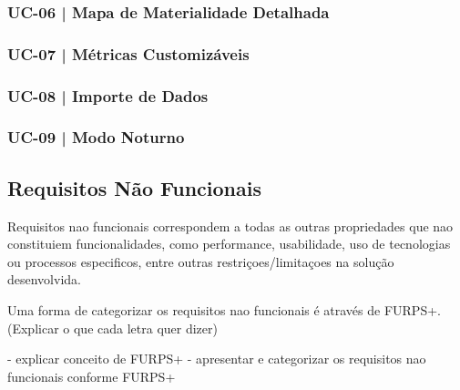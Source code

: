 
\subsubsection{UC-06 | Mapa de Materialidade Detalhada}


\subsubsection{UC-07 | Métricas Customizáveis}


\subsubsection{UC-08 | Importe de Dados}

\subsubsection{UC-09 | Modo Noturno}


\subsection{Requisitos Não Funcionais}

Requisitos nao funcionais correspondem a todas as outras propriedades que nao constituiem funcionalidades, como performance, usabilidade, uso de tecnologias ou processos especificos, entre outras restriçoes/limitaçoes na solução desenvolvida.

Uma forma de categorizar os requisitos nao funcionais  é através de FURPS+.
(Explicar o que cada letra quer dizer)

- explicar conceito de FURPS+
- apresentar e categorizar os requisitos nao funcionais conforme FURPS+

